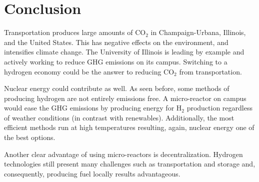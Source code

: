 \documentclass{anstrans}
\begin{document}
\section{Conclusion}

Transportation produces large amounts of CO$_2$ in Champaign-Urbana, Illinois, and the United States. This has negative effects on the environment, and intensifies climate change. The University of Illinois is leading by example and actively working to reduce GHG emissions on its campus. Switching to a hydrogen economy could be the answer to reducing CO$_2$ from transportation. 

Nuclear energy could contribute as well. As seen before, some methods of producing hydrogen are not entirely emissions free. A micro-reactor on campus would ease the GHG emissions by producing energy for H$_2$ production regardless of weather conditions (in contrast with renewables). Additionally, the most efficient methods run at high temperatures resulting, again, nuclear energy one of the best options.

Another clear advantage of using micro-reactors is decentralization. Hydrogen technologies still present many challenges such as transportation and storage \cite{office_of_energy_efficiency_and_renewable_energy_hydrogen_2020}\cite{office_of_energy_efficiency_and_renewable_energy_hydrogen_delivery_2020} and, consequently, producing fuel locally results advantageous.



\end{document}
